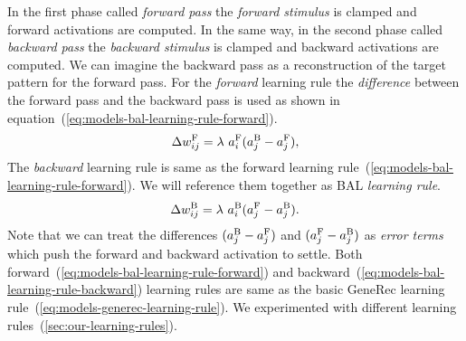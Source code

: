 In the first phase called \emph{forward pass} the \emph{forward stimulus} is clamped and forward activations are computed. In the same way, in the second phase called \emph{backward pass} the \emph{backward stimulus} is clamped and backward activations are computed. We can imagine the backward pass as a reconstruction of the target pattern for the forward pass. For the \emph{forward} learning rule the \emph{difference} between the forward pass and the backward pass is used as shown in equation~(\ref{eq:models-bal-learning-rule-forward}). 
\begin{equation}
  \label{eq:models-bal-learning-rule-forward}
  \Delta w_{ij}^{\rm F} = \lambda \ a_i^{\rm F}(a_j^{\rm B} - a_j^{\rm F}),
\end{equation}
The \emph{backward} learning rule is same as the forward learning rule~(\ref{eq:models-bal-learning-rule-forward}). We will reference them together as BAL \emph{learning rule}. 
\begin{equation}
  \label{eq:models-bal-learning-rule-backward}
  \Delta w_{ij}^{\rm B} = \lambda \ a_i^{\rm B}(a_j^{\rm F} - a_j^{\rm B}). 
\end{equation}
Note that we can treat the differences $(a_j^{\rm B} - a_j^{\rm F})$ and $(a_j^{\rm F} - a_j^{\rm B})$ as \emph{error terms} which push the forward and backward activation to settle. Both forward~(\ref{eq:models-bal-learning-rule-forward}) and backward~(\ref{eq:models-bal-learning-rule-backward}) learning rules are same as the basic GeneRec learning rule~(\ref{eq:models-generec-learning-rule}). We experimented with different learning rules~(\ref{sec:our-learning-rules}). 

 


